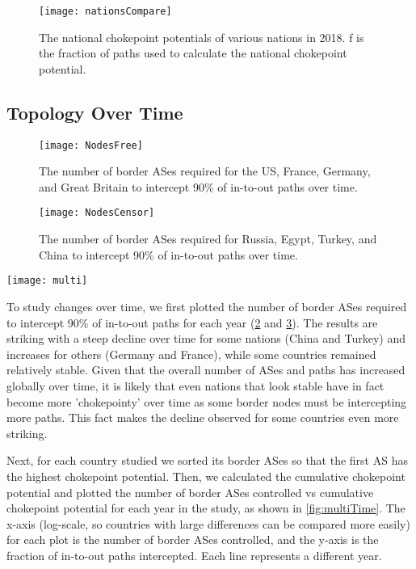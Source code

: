 \begin{figure}[ht]
	\centering
	\texttt{[image: nationsCompare]}
	\caption{The national chokepoint potentials of various nations in 2018. f is the
	fraction of paths used to calculate the national chokepoint potential.}\label{fig:nationsCompare}
\end{figure}

\subsection{Topology Over Time}

\begin{figure}
	\centering
	\texttt{[image: NodesFree]}
	\caption{The number of border ASes required for the US, France, Germany, and Great Britain to intercept 90\% of in-to-out paths over time.}\label{fig:nodesFree}
\end{figure}
\begin{figure}
	\centering
	\texttt{[image: NodesCensor]}
	\caption{The number of border ASes required for Russia, Egypt, Turkey, and China to intercept 90\% of in-to-out paths over time.}\label{fig:nodesCensor}
\end{figure}
\begin{figure*}
	\centering
	\texttt{[image: multi]}
	\caption{Chokepoint potential (in-to-out) for multiple years
          \timerange. Each plot shows the number of border ASes
          controlled (x-axis) vs. $f$ (y-axis).}\label{fig:multiTime}
\end{figure*}

To study changes over time, we first plotted the
number of border ASes required to intercept 90\% of in-to-out paths
for each year (\figurename \ref{fig:nodesFree} and \figurename
\ref{fig:nodesCensor}).  The results are striking with a steep decline
over time for some nations (China and Turkey) and increases for others
(Germany and France), while some countries remained relatively
stable. Given that the overall number of ASes and paths has increased
globally over time, it is likely that even nations that look stable
have in fact become more 'chokepointy' over time as some border nodes
must be intercepting more paths.  This fact makes the decline observed
for some countries even more striking.

Next, for each country studied we sorted its border ASes so
that the first AS has the highest chokepoint potential.
Then, we calculated the cumulative chokepoint potential
and plotted the
number of border ASes controlled vs cumulative chokepoint potential for each year in the study,
as shown in
\figurename \ref{fig:multiTime}.  The x-axis (log-scale,
so countries with large differences can be compared more
easily) for each plot is the number of border ASes controlled, and the y-axis
is the fraction of in-to-out paths intercepted. Each line represents a different
year.

